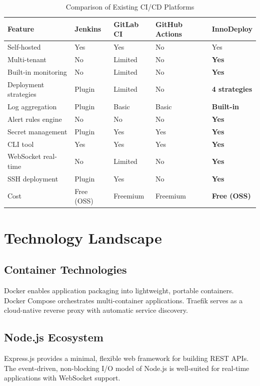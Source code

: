 \documentclass[12pt,a4paper,twoside]{report}
\begin{document}
\begin{table}[H]
\centering
\caption{Comparison of Existing CI/CD Platforms}
\label{tab:cicd-comparison}
\begin{tabularx}{\textwidth}{l|X|X|X|X}
\toprule
\textbf{Feature} & \textbf{Jenkins} & \textbf{GitLab CI} & \textbf{GitHub Actions} & \textbf{InnoDeploy} \\
\midrule
Self-hosted & Yes & Yes & No & Yes \\
Multi-tenant & No & Limited & No & \textbf{Yes} \\
Built-in monitoring & No & Limited & No & \textbf{Yes} \\
Deployment strategies & Plugin & Limited & No & \textbf{4 strategies} \\
Log aggregation & Plugin & Basic & Basic & \textbf{Built-in} \\
Alert rules engine & No & No & No & \textbf{Yes} \\
Secret management & Plugin & Yes & Yes & \textbf{Yes} \\
CLI tool & Yes & Yes & Yes & \textbf{Yes} \\
WebSocket real-time & No & Limited & No & \textbf{Yes} \\
SSH deployment & Plugin & Yes & No & \textbf{Yes} \\
Cost & Free (OSS) & Freemium & Freemium & \textbf{Free (OSS)} \\
\bottomrule
\end{tabularx}
\end{table}

\section{Technology Landscape}

\subsection{Container Technologies}
Docker enables application packaging into lightweight, portable containers. Docker Compose orchestrates multi-container applications. Traefik serves as a cloud-native reverse proxy with automatic service discovery.

\subsection{Node.js Ecosystem}
Express.js provides a minimal, flexible web framework for building REST APIs. The event-driven, non-blocking I/O model of Node.js is well-suited for real-time applications with WebSocket support.
\end{document}
